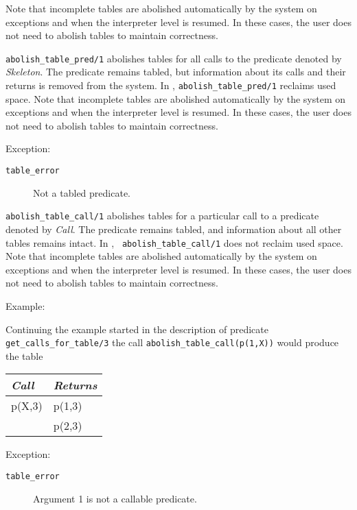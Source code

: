 \begin{description}
Note that incomplete tables are abolished automatically by the system on
exceptions and when the interpreter level is resumed.  In these cases,
the user does not need to abolish tables to maintain correctness.


{\tt abolish\_table\_pred/1} abolishes tables for all calls to the
predicate denoted by {\em Skeleton}.  The predicate remains
tabled, but information about its calls and their returns is removed
from the system.  In \version, {\tt abolish\_table\_pred/1}
reclaims used space.  Note that incomplete tables are abolished automatically
by the system on exceptions and when the interpreter level is resumed.
In these cases, the user does not need to abolish tables to maintain
correctness.

Exception:
    \begin{description}
    \item[{\tt table\_error}]
        Not a tabled predicate.
    \end{description}


{\tt abolish\_table\_call/1} abolishes tables for a particular call to
a predicate denoted by {\em Call}.  The predicate remains tabled, and
information about all other tables remains intact.  In \version, {\tt
abolish\_table\_call/1} does not reclaim used space.  Note that incomplete
tables are abolished automatically by the system on exceptions and
when the interpreter level is resumed.  In these cases, the user does
not need to abolish tables to maintain correctness.

Example:

    Continuing the example started in the description of predicate
    {\tt get\_calls\_for\_table/3} the call
    {\tt abolish\_table\_call(p(1,X))} would produce the table
    \begin{center}
    \begin{tabular}{||l|l||}               \hline
    {\em Call}			& {\em Returns} \\ \hline \hline
    p(X,3)			& p(1,3) \\ 
	       			& p(2,3) \\ \hline
    \end{tabular}
    \end{center}

Exception:
    \begin{description}
    \item[{\tt table\_error}]
	Argument 1 is not a callable predicate.
    \end{description}



\end{description}
